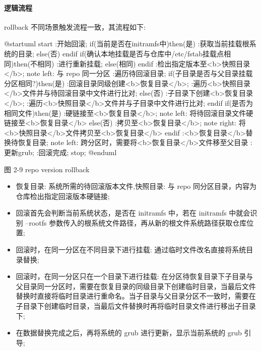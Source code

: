 \documentclass{utart}
\begin{document}
\paragraph{逻辑流程}
rollback 不同场景触发流程一致，其流程如下: 
\begin{center}
  \begin{adjustbox}{scale=0.75}
    \begin{plantuml}
      @startuml
      start
      :开始回滚;
      if(当前是否在initramfs中)then(是)
      :获取当前挂载根系统的目录;
      else(否)
      endif
      if(确认本地挂载是否与仓库中/etc/fstab挂载点相同)then(不相同)
      :进行重新挂载;
      else(相同)
      endif
      :检出指定版本至<b>快照目录</b>;
      note left: 与 repo 同一分区
      :遍历待回滚目录;
      if(子目录是否与父目录挂载分区相同?)then(是)
      :回滚目录同级创建<b>恢复目录</b>;
      :遍历<b>快照目录</b>文件并与待回滚目录中文件进行比对;
      else(否)
      :子目录下创建<b>恢复目录</b>;
      :遍历<b>快照目录</b>文件并与子目录中文件进行比对;
      endif
      if(是否为相同文件)then(是)
      :硬链接至<b>恢复目录</b>;
      note left: 将待回滚目录文件硬链接至<b>恢复目录</b>
      else(否)
      :拷贝至<b>恢复目录</b>;
      note right: 将<b>快照目录</b>文件拷贝至<b>恢复目录</b>
      endif
      :<b>恢复目录</b>替换待恢复目录;
      note left: 跨分区时，需要将<b>恢复目录</b>文件移至父目录
      :更新grub;
      :回滚完成;
      stop;
      @enduml
    \end{plantuml}
  \end{adjustbox}

  图 2-9 repo version rollback
\end{center}

\begin{itemize}[leftmargin=4em]
  \item 恢复目录: 系统所需的待回滚版本文件,快照目录:  与 repo 同分区目录，内容为仓库检出指定回滚版本硬链接;
  \item 回滚首先会判断当前系统状态，是否在 initramfs 中，若在 initramfs 中就会识别 –rootfs 参数传入的根系统文件路径，再从新的根文件系统路径获取仓库位置;
  \item 回滚时，在同一分区在不同目录下进行挂载: 通过临时文件改名直接将系统目录替换;
  \item 回滚时，在同一分区只在一个目录下进行挂载: 在分区待恢复目录下子目录与父目录同一分区时，需要在恢复目录的同级目录下创建临时目录，当最后文件替换时直接将临时目录进行重命名。当子目录与父目录分区不一致时，需要在子目录下创建临时目录，当最后文件替换时再将临时目录文件进行移出子目录下;
  \item 在数据替换完成之后，再将系统的 grub 进行更新，显示当前系统的 grub 引导;
\end{itemize}
\end{document}
